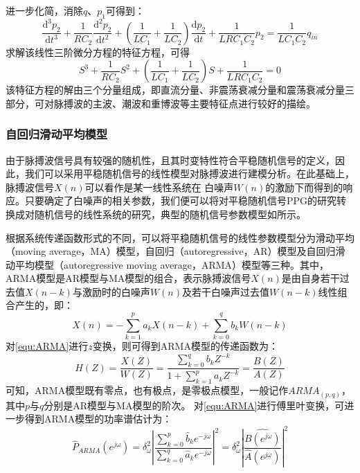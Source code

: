 进一步化简，消除$q$、$p_{1}$可得到：
\begin{equation}
    \label{euq:diff}
    \frac{\mathrm{d^3} p_{2}}{\mathrm{d} t^3}+\frac{1}{RC_{2}}\frac{\mathrm{d}^2p_{2} }{\mathrm{d} t^2}+
    (\frac{1}{LC_{1}}+\frac{1}{LC_{2}})\frac{\mathrm{d} p_{2}}{\mathrm{d} t}+\frac{1}{LRC_{1}C_{2}}p_{2}
    =\frac{1}{LC_{1}C_{2}}q_{in}
\end{equation}
求解该线性三阶微分方程的特征方程，可得
\begin{equation}
    \label{euq:character}
    S^3+\frac{1}{RC_{2}}S^2+(\frac{1}{LC_{1}}+\frac{1}{LC_{2}})S+\frac{1}{LRC_{1}C_{2}}=0
\end{equation}
该特征方程的解由三个分量组成，即直流分量、非震荡衰减分量和震荡衰减分量三部分，可对脉搏波的主波、潮波和重博波等主要特征点进行较好的描绘。

\subsubsection{自回归滑动平均模型}
由于脉搏波信号具有较强的随机性，且其时变特性符合平稳随机信号的定义，因此，我们可以采用平稳随机信号的线性模型对脉搏波进行建模分析\cite{TJXHCL,PPGYY}。在此基础上，脉搏波信号$X(n)$可以看作是某一线性系统在
白噪声$W(n)$的激励下而得到的响应。只要确定了白噪声的相关参数，我们便可以将对平稳随机信号PPG的研究转换成对随机信号的线性系统的研究，典型的随机信号参数模型如所示。

根据系统传递函数形式的不同，可以将平稳随机信号的线性参数模型分为滑动平均（moving average，MA）模型，自回归（autoregressive，AR）模型及自回归滑动平均模型（autoregressive moving average，ARMA）模型等三种。其中，
ARMA模型是AR模型与MA模型的组合，表示脉搏波信号$X(n)$是由自身若干过去值$X(n-k)$与激励时的白噪声$W(n)$及若干白噪声过去值$W(n-k)$线性组合产生的，即：
\begin{equation}
    \label{equ:ARMA}
    X(n)=-\sum_{k=1}^{p}a_{k}X(n-k)+\sum_{k=0}^{q}b_{k}W(n-k)
\end{equation}
对\autoref{equ:ARMA}进行$z$变换，则可得到ARMA模型的传递函数为：
\begin{equation}
    \label{equ:ARMAH}
    H(Z)=\frac{X(Z)}{W(Z)}=\frac{\sum_{k=0}^{q}b_{k}Z^{-k}}{1+\sum_{k=1}^{p}a_{k}Z^{-k}}=\frac{B(Z)}{A(Z)}
\end{equation}
可知，ARMA模型既有零点，也有极点，是零极点模型，一般记作$ARMA_{(p,q)}$，其中$p$与$q$分别是AR模型与MA模型的阶次。
对\autoref{equ:ARMA}进行傅里叶变换，可进一步得到ARMA模型的功率谱估计为\cite{TJXHCL}：
\begin{equation}
    \label{equ:ARMAP}
    \hat{P}_{ARMA}(e^{j\omega} )=
    \delta _{\omega}^2\left |  \frac{\sum_{k=0}^{p}\hat{b}_{k}e^{-j\omega}}{\sum_{k=0}^{q}\hat{a}_{k}e^{-j\omega}}\right |^2
    =\delta _{\omega}^2\left |  \frac{\hat{B(e^{j\omega} )}}{\hat{A}(e^{j\omega} )}\right |^2
\end{equation}

